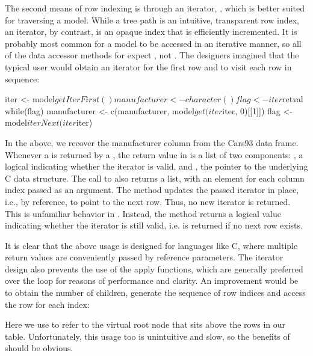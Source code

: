 
The second means of row indexing is through an iterator,
, which is better suited for traversing a model.
While a tree path is an intuitive, transparent row index, an iterator,
by contrast, is an opaque index that is efficiently incremented. It is
probably most common for a model to be accessed in an iterative
manner, so all of the data accessor methods for 
expect , not . The \GTK\/
designers imagined that the typical user would obtain an iterator for
the first row and to visit each row in sequence:
\begin{Schunk}
\begin{Sinput}
 iter <- model$getIterFirst()
 manufacturer <- character()
 flag <- iter$retval
 while(flag) {
   manufacturer <- c(manufacturer, model$get(iter$iter, 0)[[1]])
   flag <- model$iterNext(iter$iter)
 }
\end{Sinput}
\end{Schunk}
%
In the above, we recover the manufacturer column from the Cars93 data
frame. Whenever a  is returned by a
, the return value in \R\/ is a list of two
components: , a logical indicating whether the iterator
is valid, and , the pointer to the underlying C data
structure. The call to  also returns a list,
with an element for each column index passed as an argument. The
method  updates the passed iterator in
place, i.e., by reference, to point to the next row. Thus, no new
iterator is returned. This is unfamiliar behavior in \R. Instead, the
method returns a logical value indicating whether the iterator is
still valid, i.e.  is returned if no next row exists.

It is clear that the above usage is designed for languages like C,
where multiple return values are conveniently passed by reference
parameters. The iterator design also prevents the use of the apply
functions, which are generally preferred over the  loop
for reasons of performance and clarity. An improvement would be to
obtain the number of children, generate the sequence of row indices
and access the row for each index:
\begin{Schunk}
\end{Schunk}
%
Here we use  to refer to the virtual root node that sits
above the rows in our table. Unfortunately, this usage too is
unintuitive and slow, so the benefits of  should
be obvious.

